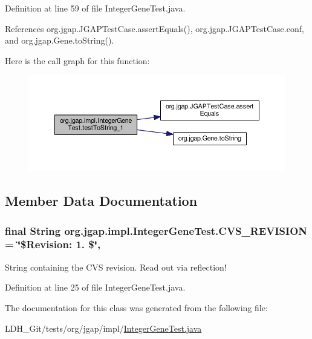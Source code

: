 Definition at line 59 of file Integer\-Gene\-Test.\-java.



References org.\-jgap.\-J\-G\-A\-P\-Test\-Case.\-assert\-Equals(), org.\-jgap.\-J\-G\-A\-P\-Test\-Case.\-conf, and org.\-jgap.\-Gene.\-to\-String().



Here is the call graph for this function\-:
\nopagebreak
\begin{figure}[H]
\begin{center}
\leavevmode
\includegraphics[width=350pt]{classorg_1_1jgap_1_1impl_1_1_integer_gene_test_a3070c9d8379c60b832d95e0b85bdc0c3_cgraph}
\end{center}
\end{figure}




\subsection{Member Data Documentation}
\hypertarget{classorg_1_1jgap_1_1impl_1_1_integer_gene_test_aa69a655fb379c9d77015476392432c6a}{
\subsubsection[{C\-V\-S\-\_\-\-R\-E\-V\-I\-S\-I\-O\-N}]{\setlength{\rightskip}{0pt plus 5cm}final String org.\-jgap.\-impl.\-Integer\-Gene\-Test.\-C\-V\-S\-\_\-\-R\-E\-V\-I\-S\-I\-O\-N = \char`\"{}\$Revision\-: 1. \$\char`\"{}\hspace{0.3cm}{\ttfamily [static]}, {\ttfamily [private]}}}\label{classorg_1_1jgap_1_1impl_1_1_integer_gene_test_aa69a655fb379c9d77015476392432c6a}
String containing the C\-V\-S revision. Read out via reflection! 

Definition at line 25 of file Integer\-Gene\-Test.\-java.



The documentation for this class was generated from the following file\-:\begin{DoxyCompactItemize}
\item 
L\-D\-H\-\_\-\-Git/tests/org/jgap/impl/\hyperlink{_integer_gene_test_8java}{Integer\-Gene\-Test.\-java}\end{DoxyCompactItemize}

